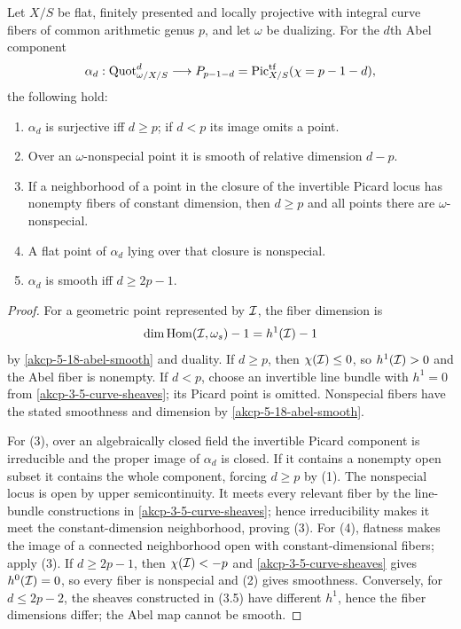 \begin{theorem}
\label{akcp-8-4-abel-curve}
Let $X/S$ be flat, finitely presented and locally projective with integral
curve fibers of common arithmetic genus $p$, and let $\omega$ be dualizing.
For the $d$th Abel component
\[
\alpha_d:\operatorname{Quot}^d_{\omega/X/S}\longrightarrow
P_{p-1-d}=\operatorname{Pic}^{\mathrm{tf}}_{X/S}(\chi=p-1-d),
\]
the following hold:
\begin{enumerate}
\item $\alpha_d$ is surjective iff $d\ge p$; if $d<p$ its image omits a point.
\item Over an $\omega$-nonspecial point it is smooth of relative dimension
      $d-p$.
\item If a neighborhood of a point in the closure of the invertible Picard
      locus has nonempty fibers of constant dimension, then $d\ge p$ and all
      points there are $\omega$-nonspecial.
\item A flat point of $\alpha_d$ lying over that closure is nonspecial.
\item $\alpha_d$ is smooth iff $d\ge2p-1$.
\end{enumerate}
\end{theorem}
\begin{proof}
For a geometric point represented by $\mathcal I$, the fiber dimension is
\[
\dim\operatorname{Hom}(\mathcal I,\omega_s)-1=h^1(\mathcal I)-1
\]
by \cref{akcp-5-18-abel-smooth} and duality.  If $d\ge p$, then
$\chi(\mathcal I)\le0$, so $h^1(\mathcal I)>0$ and the Abel fiber is nonempty.  If $d<p$,
choose an invertible line bundle with $h^1=0$ from
\cref{akcp-3-5-curve-sheaves}; its Picard point is omitted.  Nonspecial fibers
have the stated smoothness and dimension by \cref{akcp-5-18-abel-smooth}.

For (3), over an algebraically closed field the invertible Picard component is
irreducible and the proper image of $\alpha_d$ is closed.  If it contains a
nonempty open subset it contains the whole component, forcing $d\ge p$ by (1).
The nonspecial locus is open by upper semicontinuity.  It meets every relevant
fiber by the line-bundle constructions in \cref{akcp-3-5-curve-sheaves}; hence
irreducibility makes it meet the constant-dimension neighborhood, proving (3).
For (4), flatness makes the image of a connected neighborhood open with
constant-dimensional fibers; apply (3).  If $d\ge2p-1$, then
$\chi(\mathcal I)<-p$ and \cref{akcp-3-5-curve-sheaves} gives $h^0(\mathcal I)=0$, so every
fiber is nonspecial and (2) gives smoothness.  Conversely, for
$d\le2p-2$, the sheaves constructed in (3.5) have different $h^1$, hence the
fiber dimensions differ; the Abel map cannot be smooth.
\end{proof}


